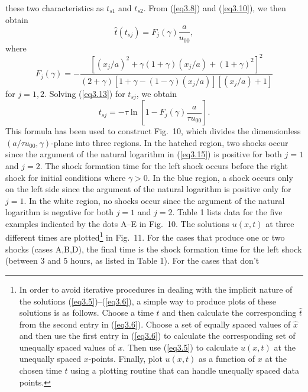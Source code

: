 \documentclass[10pt]{article}
\begin{document}
these two characteristics as $t_{s1}$ and $t_{s2}$. From (\ref{eq3.8})
and (\ref{eq3.10}), we then obtain
\begin{equation}                                 %
     \hat{t}(t_{sj}) = F_j(\gamma) \frac{a}{u_{00}},
\label{eq3.13}
\end{equation}
where
\begin{equation}                                 %
    F_j(\gamma) =-\frac{[(x_j/a)^2+\gamma(1+\gamma)(x_j/a)+(1+\gamma)^2]^2}
                       {(2+\gamma)[1+\gamma-(1-\gamma)(x_j/a)][(x_j/a)+1]}
\label{eq3.14}
\end{equation}
for $j=1,2$. Solving (\ref{eq3.13}) for $t_{sj}$, we obtain
\begin{equation}                                 %
     t_{sj} = -\tau\ln\left[1 - F_j(\gamma) \frac{a}{\tau u_{00}}\right].
\label{eq3.15}
\end{equation}
This formula has been used to construct Fig.~10, which divides the dimensionless
$(a/\tau u_{00},\gamma)$-plane into three regions. In the hatched region, two
shocks occur since the argument of the natural logarithm in (\ref{eq3.15}) is
positive for both $j=1$ and $j=2$. The shock formation time for the left shock
occurs before the right shock for initial conditions where $\gamma>0$. In the
blue region, a shock occurs only on
the left side since the argument of the natural logarithm is positive only for
$j=1$. In the white region, no shocks occur since the argument of the natural
logarithm is negative for both $j=1$ and $j=2$.  Table 1 lists data for the five
examples indicated by the dots A--E in Fig.~10. The solutions $u(x,t)$ at three
different times are plotted\footnote{In order to avoid iterative procedures in
dealing with the implicit nature of the solutions (\ref{eq3.5})--(\ref{eq3.6}),
a simple way to produce plots of these solutions is as follows. Choose a time
$t$ and then calculate the corresponding $\hat{t}$ from the second entry in
(\ref{eq3.6}). Choose a set of equally spaced values of $\hat{x}$ and then use
the first entry in (\ref{eq3.6}) to calculate the corresponding set of unequally
spaced values of $x$. Then use (\ref{eq3.5}) to calculate $u(x,t)$ at the unequally
spaced $x$-points. Finally, plot $u(x,t)$ as a function of $x$ at the chosen time
$t$ using a plotting routine that can handle unequally spaced data points.}
in Fig.~11. For the cases that produce one or two
shocks (cases A,B,D), the final time is the shock formation time for the left
shock (between 3 and 5 hours, as listed in Table 1). For the cases that don't
\end{document}
